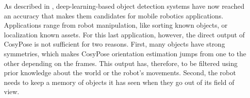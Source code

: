 


As described in , deep-learning-based object detection systems have now reached an accuracy that makes them candidates for mobile robotics applications.
Applications range from robot manipulation, like sorting known objects, or localization \wrt known assets. For this last application, however,
the direct output of CosyPose is not sufficient for two reasons. First, many objects have strong symmetries, which makes CosyPose orientation estimation jumps from one to the other
depending on the frames. This output has, therefore, to be filtered using prior knowledge about the world or the robot's movements. Second, the robot needs to keep
a memory of objects it has seen when they go out of its field of view.

